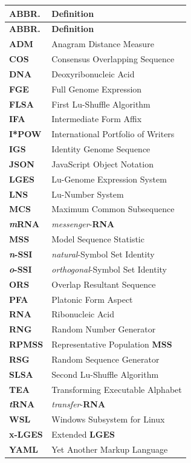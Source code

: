 \documentclass[a4paper, 18pt]{book} %
\begin{document}
\begin{longtable}{p{3cm} p{12cm}}
\textbf{ABBR.} & \textbf{Definition} \\
\hline
\endfirsthead

\textbf{ABBR.} & \textbf{Definition} \\
\hline
\endhead

\textbf{ADM} & Anagram Distance Measure \\
\textbf{COS} & Consensus Overlapping Sequence \\
\textbf{DNA} & Deoxyribonucleic Acid \\
\textbf{FGE} & Full Genome Expression \\
\textbf{FLSA} & First Lu-Shuffle Algorithm \\
\textbf{IFA} & Intermediate Form Affix \\
\textbf{I*POW} & International Portfolio of Writers \\
\textbf{IGS} & Identity Genome Sequence \\
\textbf{JSON} & JavaScript Object Notation \\
\textbf{LGES} & Lu-Genome Expression System \\
\textbf{LNS} & Lu-Number System\\
\textbf{MCS} & Maximum Common Subsequence \\
\textbf{\textit{m}RNA} & \textit{messenger}-\textbf{RNA} \\
\textbf{MSS} & Model Sequence Statistic \\
\textbf{\textit{n}-SSI} & \textit{natural}-Symbol Set Identity \\
\textbf{\textit{o}-SSI} & \textit{orthogonal}-Symbol Set Identity \\
\textbf{ORS} & Overlap Resultant Sequence \\
\textbf{PFA} & Platonic Form Aspect \\
\textbf{RNA} & Ribonucleic Acid  \\
\textbf{RNG} & Random Number Generator  \\
\textbf{RPMSS} & Representative Population \textbf{MSS}  \\
\textbf{RSG} & Random Sequence Generator  \\
\textbf{SLSA} & Second Lu-Shuffle Algorithm  \\
\textbf{TEA} & Transforming Executable Alphabet \\
\textbf{\textit{t}RNA} & \textit{transfer}-\textbf{RNA} \\
\textbf{WSL} & Windows Subsystem for Linux\\
\textbf{x-LGES} & Extended \textbf{LGES} \\
\textbf{YAML} & Yet Another Markup Language \\


\end{longtable}
\end{document}
